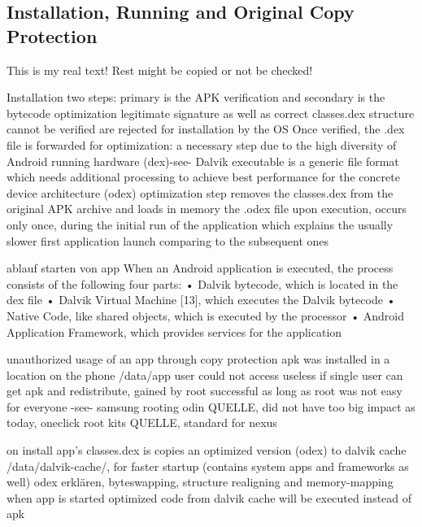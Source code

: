 \subsection{Installation, Running and Original Copy Protection} \label{subsection:android-copy}
This is my real text! Rest might be copied or not be checked!

%
Installation two steps:  primary is the APK verification and secondary is the bytecode optimization\newline
legitimate signature as well as correct classes.dex structure cannot be verified are rejected for installation by the OS\newline
Once verified, the .dex file is forwarded for optimization: a necessary step due to the high diversity of Android running hardware (dex)-see- Dalvik executable is a generic file format which needs additional processing to achieve best performance for the concrete device architecture (odex)\newline
optimization\newline
step removes the classes.dex from the original APK archive and loads in memory the .odex file upon execution, occurs only once, during the initial run of the application which explains the usually slower first application launch comparing to the subsequent ones

ablauf starten von app\newline
When an Android application is executed, the process consists of the following four parts:
• Dalvik bytecode, which is located in the dex file
• Dalvik Virtual Machine [13], which executes the Dalvik bytecode
• Native Code, like shared objects, which is executed by the processor
• Android Application Framework, which provides services for the application\newline
\cite{kovachevaMaster}
%


%
unauthorized usage of an app through copy protection
apk was installed in a location on the phone /data/app user could not access
useless if single user can get apk and redistribute, gained by root
successful as long as root was not easy for everyone -see- samsung rooting odin QUELLE, did not have too big impact as today, oneclick root kits QUELLE, standard for nexus

on install app's classes.dex is copies an optimized version (odex) to dalvik cache /data/dalvik-cache/, for faster startup (contains system apps and frameworks as well)
odex erklären, byteswapping, structure realigning and memory-mapping
when app is started optimized code from dalvik cache will be executed instead of apk
\cite{munteanLicense}
%

